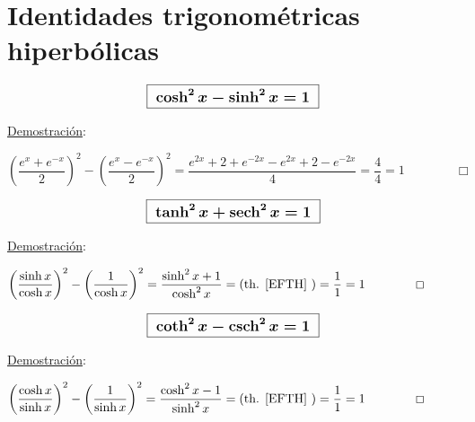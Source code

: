 \vspace{1cm}
\section{Identidades trigonométricas hiperbólicas}
\vspace{0.5cm}

\begin{theorem}

\begin{equation}
\label{EFTH}	
\large{ \boxed{ \ \boldsymbol{ \cosh^2 x-\sinh^2 x=1 } \ } }	
\end{equation}
\end{theorem}

\normalsize{\underline{Demostración}:} 

$\left( \dfrac{e^x+e^{-x}}{2} \right)^2-\left( \dfrac{e^x-e^{-x}}{2} \right)^2=\dfrac{e^{2x}+2+e^{-2x}-e^{2x}+2-e^{-2x}}{4}=\dfrac 4 4 = 1 \qquad \qquad \Box$

\vspace{5mm}
\begin{theorem}

\begin{equation}
\label{EFTH2}
\large{ \boxed{ \ \boldsymbol{ \tanh^2 x+\sech^2 x=1 } \ } }	
\end{equation}
\end{theorem}

\normalsize{\underline{Demostración}:} 

$\left(\dfrac{\sinh x}{\cosh x} \right)^2-\left( \dfrac{1}{\cosh x}\right)^2=\dfrac{\sinh^2 x+1}{\cosh^2 x}= \text{(th. \ref{EFTH} )} = \dfrac 1 1 =1 \qquad \qquad \Box$


\vspace{5mm}
\begin{theorem}

$$\large{ \boxed{ \ \boldsymbol{ \coth^2 x-\csch^2 x=1 } \ } }	$$
\end{theorem}

\normalsize{\underline{Demostración}:} 

$\left(\dfrac{\cosh x}{\sinh x} \right)^2-\left( \dfrac{1}{\sinh x}\right)^2=\dfrac{\cosh^2 x-1}{\sinh^2 x}= \text{(th. \ref{EFTH} )} = \dfrac 1 1 =1 \qquad \qquad \Box$


